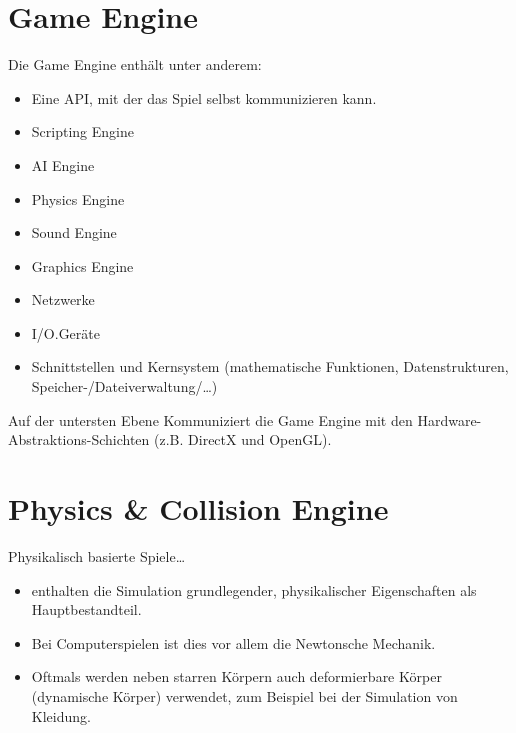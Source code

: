 \documentclass[a4paper, 11pt, accentcolor = tud3b]{tudreport}
\begin{document}
        \section{Game Engine} %
            Die Game Engine enthält unter anderem:
            \begin{itemize}
            	\item Eine API, mit der das Spiel selbst kommunizieren kann.
            	\item Scripting Engine
            	\item AI Engine
            	\item Physics Engine
            	\item Sound Engine
            	\item Graphics Engine
            	\item Netzwerke
            	\item I/O.Geräte
            	\item Schnittstellen und Kernsystem (mathematische Funktionen, Datenstrukturen, Speicher-/Dateiverwaltung/\dots)
            \end{itemize}
            Auf der untersten Ebene Kommuniziert die Game Engine mit den Hardware-Abstraktions-Schichten (z.B. DirectX und OpenGL).

        \section{Physics \& Collision Engine} %
	        Physikalisch basierte Spiele\dots
	        \begin{itemize}
	        	\item enthalten die Simulation grundlegender, physikalischer Eigenschaften als Hauptbestandteil.
	        	\item Bei Computerspielen ist dies vor allem die Newtonsche Mechanik.
	        	\item Oftmals werden neben starren Körpern auch deformierbare Körper (dynamische Körper) verwendet, zum Beispiel bei der Simulation von Kleidung.
	        \end{itemize}
	        
\end{document}

